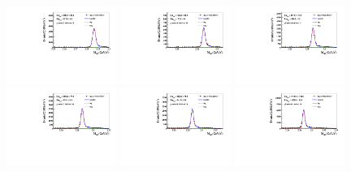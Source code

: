 \begin{figure}\centering
    \includegraphics[width=0.32\textwidth]{figure/fit_mbc/STdata4600_1001.pdf}
    \includegraphics[width=0.32\textwidth]{figure/fit_mbc/STdata4612_1001.pdf}
    \includegraphics[width=0.32\textwidth]{figure/fit_mbc/STdata4626_1001.pdf}\\
    \includegraphics[width=0.32\textwidth]{figure/fit_mbc/STdata4640_1001.pdf}
    \includegraphics[width=0.32\textwidth]{figure/fit_mbc/STdata4660_1001.pdf}
    \includegraphics[width=0.32\textwidth]{figure/fit_mbc/STdata4680_1001.pdf}\\

\end{figure}
